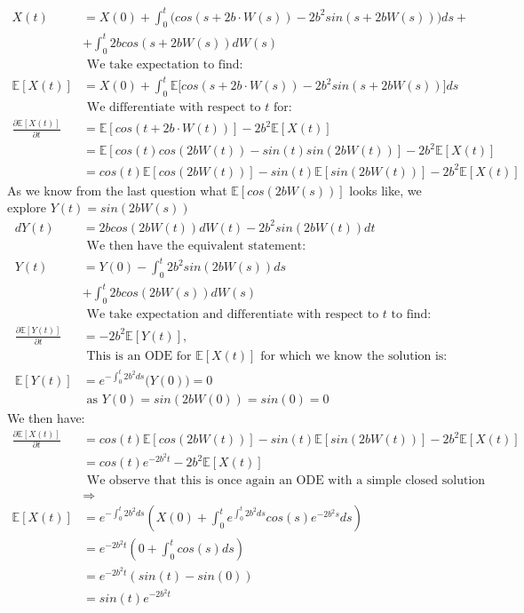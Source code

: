 \documentclass[12pt,twoside, letter]{exam}
\theoremstyle{definition}
\newcommand{\ee}{\mathbb{E}}
\begin{document}
\begin{enumerate}
\begin{solution}
\begin{align*}
        X(t) &= X(0) + \int^t_0 \bigg(cos(s + 2b \cdot W(s)) - 2b^2 sin(s + 2bW(s)) \bigg)ds + \\
        &+ \int^t_0 2b cos(s + 2bW(s))dW(s) \\
        &\text{ We take expectation to find: } \\
        \ee[X(t)] &= X(0) + \int^t_0 \ee \bigg[cos(s + 2b \cdot W(s)) - 2b^2 sin(s + 2bW(s))\bigg] ds \\
        &\text{ We differentiate with respect to $t$ for: } \\
        \frac{\partial \ee[X(t)]}{\partial t} &= \ee[cos(t + 2b \cdot W(t))] - 2b^2\ee[X(t)] \\
        &= \ee[cos(t)cos(2bW(t)) - sin(t)sin(2bW(t))] - 2b^2\ee[X(t)] \\
        &= cos(t)\ee[cos(2bW(t))] - sin(t)\ee[sin(2bW(t))] - 2b^2\ee[X(t)]
      \end{align*}
      As we know from the last question what $\ee[cos(2bW(s))]$ looks like, we explore $Y(t) = sin(2bW(s))$
      \begin{align*}
        dY(t) &= 2b cos(2bW(t)) dW(t) - 2b^2 sin(2bW(t))dt \\
        &\text{ We then have the equivalent statement: } \\
        Y(t) &= Y(0) - \int^t_0 2b^2 sin(2bW(s)) ds \\
        &+ \int^t_0 2b cos(2bW(s)) dW(s) \\
        &\text{ We take expectation and differentiate with respect to $t$ to find: } \\
        \frac{\partial \ee[Y(t)]}{\partial t} &= -2b^2\ee[Y(t)], \\
        &\text{ This is an ODE for $\ee[X(t)]$ for which we know the solution is:} \\
        \ee[Y(t)] &= e^{-\int^t_0 2b^2 ds}\bigg( Y(0) \bigg)  = 0\\
        &\text{ as $Y(0) = sin(2bW(0)) = sin(0) = 0$}
      \end{align*}
      We then have:
      \begin{align*}
        \frac{\partial \ee[X(t)]}{\partial t} &= cos(t)\ee[cos(2bW(t))] - sin(t)\ee[sin(2bW(t))] - 2b^2\ee[X(t)] \\
        &= cos(t)e^{-2b^2t} - 2b^2\ee[X(t)] \\
        &\text{ We observe that this is once again an ODE with a simple closed solution} \\
        &\Rightarrow \\
        \ee[X(t)] &= e^{-\int^t_0 2b^2 ds}(X(0) + \int^t_0 e^{\int^t_0 2b^2ds}cos(s)e^{-2b^2s} ds) \\
        &= e^{-2b^2t}(0 + \int^t_0 cos(s) ds ) \\
        &= e^{-2b^2t}(sin(t) - sin(0)) \\
        &= sin(t)e^{-2b^2t}
      \end{align*}
    \end{solution}
\end{enumerate}
\end{document}
